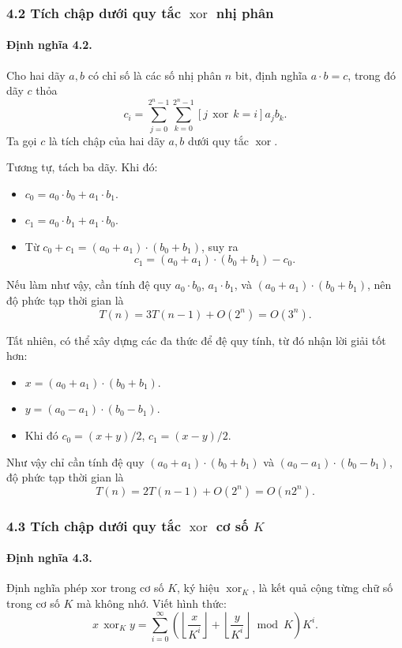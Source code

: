 \documentclass[11pt]{article}
\begin{document}
\subsubsection*{4.2 Tích chập dưới quy tắc \texorpdfstring{\(\operatorname{xor}\)}{xor} nhị phân}

\paragraph{Định nghĩa 4.2.}
Cho hai dãy \(a,b\) có chỉ số là các số nhị phân \(n\) bit, định nghĩa
\(a\cdot b=c\), trong đó dãy \(c\) thỏa
\[
  c_i=\sum_{j=0}^{2^n-1}\sum_{k=0}^{2^n-1}
  [j\operatorname{\,xor\,}k=i]a_jb_k.
\]
Ta gọi \(c\) là tích chập của hai dãy \(a,b\) dưới quy tắc
\(\operatorname{xor}\).

Tương tự, tách ba dãy. Khi đó:
\begin{itemize}
  \item \(c_0=a_0\cdot b_0+a_1\cdot b_1\).
  \item \(c_1=a_0\cdot b_1+a_1\cdot b_0\).
  \item Từ \(c_0+c_1=(a_0+a_1)\cdot(b_0+b_1)\), suy ra
  \[
    c_1=(a_0+a_1)\cdot(b_0+b_1)-c_0.
  \]
\end{itemize}

Nếu làm như vậy, cần tính đệ quy
\(a_0\cdot b_0\), \(a_1\cdot b_1\), và
\((a_0+a_1)\cdot(b_0+b_1)\), nên độ phức tạp thời gian là
\[
  T(n)=3T(n-1)+O(2^n)=O(3^n).
\]

Tất nhiên, có thể xây dựng các đa thức để đệ quy tính, từ đó nhận lời giải tốt
hơn:
\begin{itemize}
  \item \(x=(a_0+a_1)\cdot(b_0+b_1)\).
  \item \(y=(a_0-a_1)\cdot(b_0-b_1)\).
  \item Khi đó \(c_0=(x+y)/2\), \(c_1=(x-y)/2\).
\end{itemize}

Như vậy chỉ cần tính đệ quy
\((a_0+a_1)\cdot(b_0+b_1)\) và
\((a_0-a_1)\cdot(b_0-b_1)\), độ phức tạp thời gian là
\[
  T(n)=2T(n-1)+O(2^n)=O(n2^n).
\]

\subsubsection*{4.3 Tích chập dưới quy tắc \texorpdfstring{\(\operatorname{xor}\)}{xor} cơ số \(K\)}

\paragraph{Định nghĩa 4.3.}
Định nghĩa phép xor trong cơ số \(K\), ký hiệu \(\operatorname{xor}_K\), là
kết quả cộng từng chữ số trong cơ số \(K\) mà không nhớ. Viết hình thức:
\[
  x\operatorname{\,xor}_K y
  =
  \sum_{i=0}^{\infty}
  \left(
    \left\lfloor\frac{x}{K^i}\right\rfloor+
    \left\lfloor\frac{y}{K^i}\right\rfloor
    \bmod K
  \right)K^i.
\]
\end{document}
